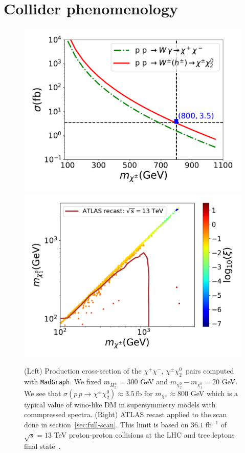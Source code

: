 \documentclass[12pt,letterpaper]{article}
\begin{document}
\section{Collider phenomenology}
\label{sec:collider}
%
\begin{figure}[h]
\begin{center}
\includegraphics[scale=0.43]{sigma_pp_xx_MadGraph}
\includegraphics[scale=0.42]{compressed_spectra}
\caption{ (Left) Production cross-section of the $\chi^+\chi^-$, $\chi^{\pm}\chi_2^0\,$ pairs computed with \texttt{MadGraph}\cite{Alwall:2014hca}. We fixed $m_{H_2^{\pm}}=300$ GeV and $m_{\chi_2^0}-m_{\chi_1^0}=20$ GeV. We see that $\sigma(p\,p\to\chi^{\pm}\chi_2^0)\approx 3.5\,\text{fb}$ for $m_{\chi^{\pm}}\approx 800$ GeV which is a typical value of wino-like DM in supersymmetry models with commpressed spectra.
(Right) ATLAS recast applied to the scan done in section~\ref{sec:full-scan}. This limit is based on $36.1\; \text{fb}^{-1}$ of $\sqrt{s} = 13$ TeV proton-proton collisions at the LHC and tree leptons final state~\cite{Aaboud:2018jiw}. }
\label{fig:LHC}
\end{center}
\end{figure}
\end{document}
